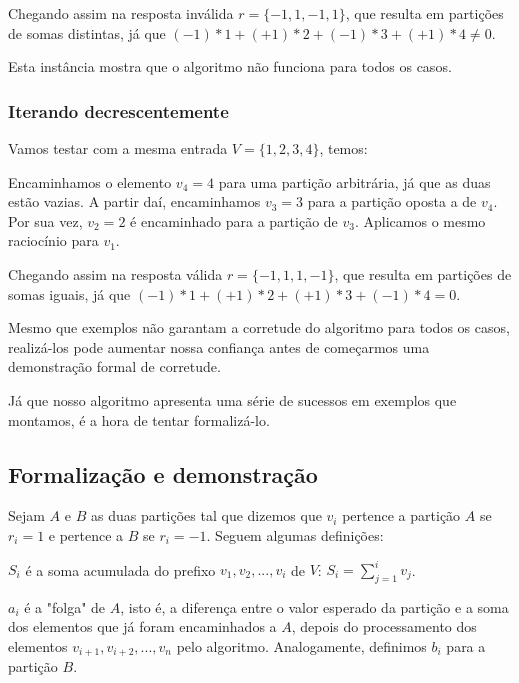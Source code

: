 Chegando assim na resposta inválida $r = \{-1, 1, -1, 1\}$, que resulta em partições de somas distintas, já que $(-1)*1 + (+1)*2 + (-1)*3 + (+1)*4 \neq 0$.

Esta instância mostra que o algoritmo não funciona para todos os casos.

\subsubsection*{Iterando decrescentemente}

Vamos testar com a mesma entrada $V = \{1, 2, 3, 4\}$, temos:

Encaminhamos o elemento $v_4 = 4$ para uma partição arbitrária, já que as duas estão vazias. A partir daí, encaminhamos $v_3 = 3$ para a partição oposta a de $v_4$. Por sua vez, $v_2 = 2$ é encaminhado para a partição de $v_3$. Aplicamos o mesmo raciocínio para $v_1$.

Chegando assim na resposta válida $r = \{-1, 1, 1, -1\}$, que resulta em partições de somas iguais, já que $(-1)*1 + (+1)*2 + (+1)*3 + (-1)*4 = 0$.

Mesmo que exemplos não garantam a corretude do algoritmo para todos os casos, realizá-los pode aumentar nossa confiança antes de começarmos uma demonstração formal de corretude.

Já que nosso algoritmo apresenta uma série de sucessos em exemplos que montamos, é a hora de tentar formalizá-lo.

\subsection*{Formalização e demonstração}

Sejam $A$ e $B$ as duas partições tal que dizemos que $v_i$ pertence a partição $A$ se $r_i = 1$ e pertence a $B$ se $r_i = -1$. Seguem algumas definições:

\begin{defi}
$S_i$ é a soma acumulada do prefixo $v_1, v_2, ..., v_i$ de $V$: $S_i = \sum_{j = 1}^{i} v_j$.
\end{defi}

\begin{defi}
$a_i$ é a "folga" de $A$, isto é, a diferença entre o valor esperado da partição e a soma dos elementos que já foram encaminhados a $A$, depois do processamento dos elementos $v_{i + 1}, v_{i + 2}, ..., v_{n}$ pelo algoritmo.
Analogamente, definimos $b_i$ para a partição $B$.
\end{defi}

